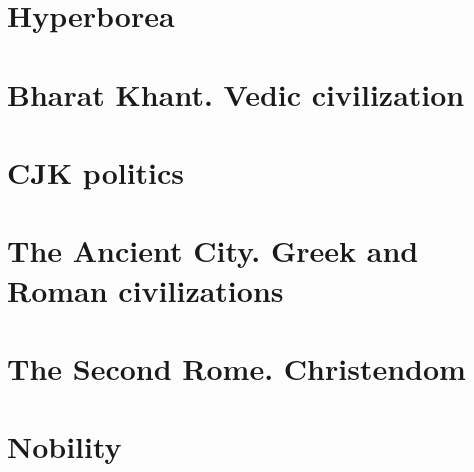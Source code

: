 \documentclass[a4paper,12pt,twoside]{book}
\begin{document}
\chapter{Hyperborea}





\chapter{Bharat Khant. Vedic civilization}


\chapter{CJK politics}


\chapter{The Ancient City. Greek and Roman civilizations}






\chapter{The Second Rome. Christendom}








\chapter{Nobility}



\end{document}
